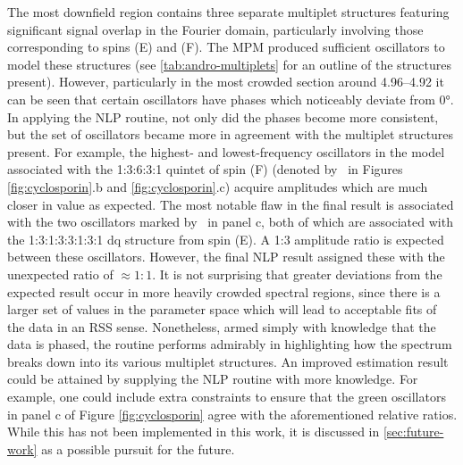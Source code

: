 The most downfield region contains three separate multiplet structures
featuring significant signal overlap in the Fourier domain, particularly
involving those corresponding to spins (E) and (F).
The \ac{MPM} produced sufficient oscillators to model these
structures (see \cref{tab:andro-multiplets} for an outline of the structures
present).
However, particularly in the most crowded section around
\SIrange{4.96}{4.92}{\partspermillion} it can be seen that certain oscillators
have phases which noticeably deviate from \ang{0}. In applying the \ac{NLP}
routine, not only did the phases become more consistent,
but the set of oscillators became more in agreement with the multiplet
structures present. For example, the highest- and lowest-frequency oscillators
in the model associated with the 1:3:6:3:1 quintet of spin (F) (denoted by
\textdagger\ in Figures \ref{fig:cyclosporin}.b and \ref{fig:cyclosporin}.c)
acquire amplitudes which
are much closer in value as expected. The most
notable flaw in the final result is associated with the two oscillators marked
by \textdaggerdbl\ in panel c, both of which are associated with the
1:3:1:3:3:1:3:1 dq structure from spin (E). A 1:3 amplitude ratio is expected
between these oscillators. However, the final \ac{NLP} result assigned these
with the unexpected ratio of $\approx 1:1$. It is not surprising
that greater deviations from the expected result occur in more heavily crowded spectral
regions, since there is a larger set of values in the parameter space which
will lead to acceptable fits of the data in an \ac{RSS} sense. Nonetheless,
armed simply with knowledge that the data is phased, the routine performs
admirably in highlighting  how the spectrum breaks down into its various
multiplet structures. An improved estimation result could be attained by
supplying the \ac{NLP} routine with more knowledge. For example, one could
include extra constraints to ensure that the green oscillators in panel c of
Figure \ref{fig:cyclosporin} agree with the aforementioned relative ratios.
While this has not been implemented in this work, it is discussed in
\cref{sec:future-work} as a possible pursuit for the future.
